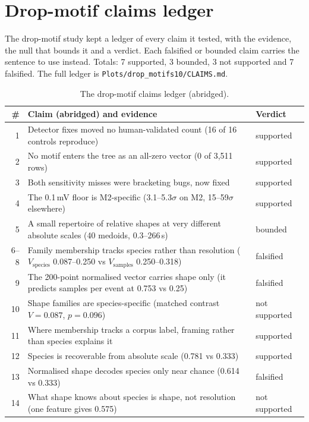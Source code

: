 \chapter{Drop-motif claims ledger}
\label{app:claims}

The drop-motif study kept a ledger of every claim it tested, with the evidence, the null that bounds it and a verdict. Each falsified or bounded claim carries the sentence to use instead. Totals: 7 supported, 3 bounded, 3 not supported and 7 falsified. The full ledger is \texttt{Plots/drop\_motifs10/CLAIMS.md}.

\begin{table}[htbp]
\caption[{The drop-motif claims ledger (abridged).}]{The drop-motif claims ledger (abridged).}
\label{tab:claims}
\scriptsize
\begin{tabularx}{\textwidth}{r X p{2.0cm}}
\toprule
\textbf{\#} & \textbf{Claim (abridged) and evidence} & \textbf{Verdict}\\
\midrule
1 & Detector fixes moved no human-validated count (16 of 16 controls reproduce) & supported\\
2 & No motif enters the tree as an all-zero vector (0 of 3,511 rows) & supported\\
3 & Both sensitivity misses were bracketing bugs, now fixed & supported\\
4 & The 0.1\,mV floor is M2-specific (3.1--5.3$\sigma$ on M2, 15--59$\sigma$ elsewhere) & supported\\
5 & A small repertoire of relative shapes at very different absolute scales (40 medoids, 0.3--266\,s) & bounded\\
6--8 & Family membership tracks species rather than resolution ($V_\text{species}$ 0.087--0.250 vs $V_\text{samples}$ 0.250--0.318) & falsified\\
9 & The 200-point normalised vector carries shape only (it predicts samples per event at 0.753 vs 0.25) & falsified\\
10 & Shape families are species-specific (matched contrast $V=0.087$, $p=0.096$) & not supported\\
11 & Where membership tracks a corpus label, framing rather than species explains it & supported\\
12 & Species is recoverable from absolute scale (0.781 vs 0.333) & supported\\
13 & Normalised shape decodes species only near chance (0.614 vs 0.333) & falsified\\
14 & What shape knows about species is shape, not resolution (one feature gives 0.575) & not supported\\

\end{tabularx}
\end{table}
